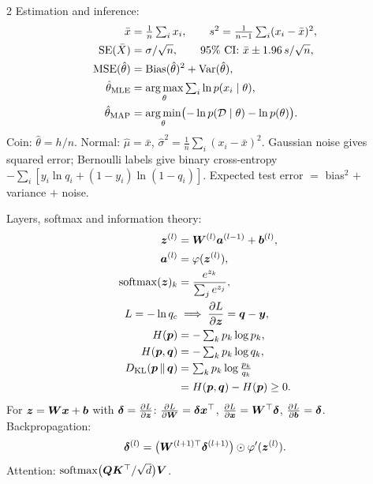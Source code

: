 \begin{multicols}{2}
Estimation and inference:
\begin{align*}
  \bar x &= \tfrac1n\textstyle\sum_ix_i, \qquad
    s^2 = \tfrac{1}{n-1}\textstyle\sum_i(x_i - \bar x)^2,\\
  \operatorname{SE}(\bar X) &= \sigma/\sqrt n, \qquad
    \text{95\% CI: } \bar x \pm 1.96\,s/\sqrt n,\\
  \operatorname{MSE}(\hat\theta) &= \operatorname{Bias}(\hat\theta)^2 + \operatorname{Var}(\hat\theta),\\
  \hat\theta_{\mathrm{MLE}} &= \operatorname*{arg\,max}_\theta\textstyle\sum_i\ln p(x_i \mid \theta),\\
  \hat\theta_{\mathrm{MAP}} &= \operatorname*{arg\,min}_\theta\bigl(-\ln p(\mathcal{D} \mid \theta) - \ln p(\theta)\bigr).
\end{align*}
Coin: $\hat\theta = h/n$. Normal: $\hat\mu = \bar x$, $\hat\sigma^2 = \frac1n\sum_i(x_i - \bar x)^2$.
Gaussian noise gives squared error; Bernoulli labels give binary cross-entropy
$-\sum_i[y_i\ln q_i + (1 - y_i)\ln(1 - q_i)]$.
Expected test error $=$ bias$^2$ $+$ variance $+$ noise.

Layers, softmax and information theory:
\begin{align*}
  \bm{z}^{(l)} &= \bm{W}^{(l)}\bm{a}^{(l-1)} + \bm{b}^{(l)},\\
  \bm{a}^{(l)} &= \varphi(\bm{z}^{(l)}),\\
  \operatorname{softmax}(\bm{z})_k &= \frac{e^{z_k}}{\sum_je^{z_j}},\\
  L = -\ln q_c &\;\Longrightarrow\; \frac{\partial L}{\partial \bm{z}} = \bm{q} - \bm{y},\\
  H(\bm{p}) &= -\textstyle\sum_kp_k\log p_k,\\
  H(\bm{p}, \bm{q}) &= -\textstyle\sum_kp_k\log q_k,\\
  D_{\operatorname{KL}}(\bm{p}\,\Vert\,\bm{q}) &= \textstyle\sum_kp_k\log\frac{p_k}{q_k}\\
  &= H(\bm{p}, \bm{q}) - H(\bm{p}) \ge 0 .
\end{align*}
For $\bm{z} = \bm{W}\bm{x} + \bm{b}$ with $\bm{\delta} = \frac{\partial L}{\partial \bm{z}}$:
$\frac{\partial L}{\partial \bm{W}} = \bm{\delta}\bm{x}^\top$, $\frac{\partial L}{\partial \bm{x}} = \bm{W}^\top\bm{\delta}$,
$\frac{\partial L}{\partial \bm{b}} = \bm{\delta}$. Backpropagation:
\[
  \bm{\delta}^{(l)} = \bigl(\bm{W}^{(l+1)\top}\bm{\delta}^{(l+1)}\bigr) \odot \varphi'(\bm{z}^{(l)}).
\]
Attention: $\operatorname{softmax}\bigl(\bm{Q}\bm{K}^\top/\sqrt d\bigr)\bm{V}$.
\end{multicols}
